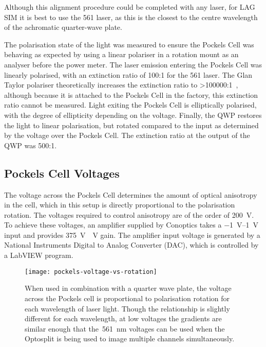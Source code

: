 Although this alignment procedure could be completed with any laser, for LAG SIM it is best to use the 561 laser, as this is the closest to the centre wavelength of the achromatic quarter-wave plate. 

The polarisation state of the light was measured to ensure the Pockels Cell was behaving as expected by using a linear polariser in a rotation mount as an analyser before the power meter. 
The laser emission entering the Pockels Cell was linearly polarised, with an extinction ratio of 100:1 for the 561 laser. 
The Glan Taylor polariser theoretically increases the extinction ratio to >\num{100000}:1~\cite{bennett1995handbook}, although because it is attached to the Pockels Cell in the factory, this extinction ratio cannot be measured. 
Light exiting the Pockels Cell is elliptically polarised, with the degree of ellipticity depending on the voltage. 
Finally, the QWP restores the light to linear polarisation, but rotated compared to the input as determined by the voltage over the Pockels Cell.
The extinction ratio at the output of the QWP was 500:1. 

\subsection{Pockels Cell Voltages}
The voltage across the Pockels Cell determines the amount of optical anisotropy in the cell, which in this setup is directly proportional to the polarisation rotation. 
The voltages required to control anisotropy are of the order of \SI{200}{\volt}. 
To achieve these voltages, an amplifier supplied by Conoptics takes a \SIrange{-1}{1}{\volt} input and provides \SI{375}{\volt\/\volt} gain. 
The amplifier input voltage is generated by a National Instruments Digital to Analog Converter (DAC), which is controlled by a LabVIEW program. 

\begin{figure}[htbp!]
\centering
\texttt{[image: pockels-voltage-vs-rotation]}
\caption[LAG SIM: A Pockels cell is used to rotate the polarisation of laser light for maximum SIM pattern contrast]{When used in combination with a quarter wave plate, the voltage across the Pockels cell is proportional to polarisation rotation for each wavelength of laser light. Though the relationship is slightly different for each wavelength, at low voltages the gradients are similar enough that the~\SI{561}{\nano\metre} voltages can be used when the Optosplit is being used to image multiple channels simultaneously.}
\label{fig:pockels-voltage-rotation}
\end{figure}

